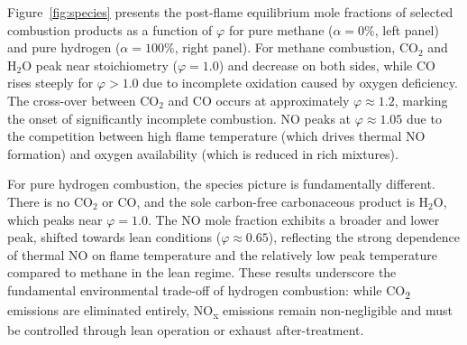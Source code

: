 \documentclass[12pt,a4paper]{article}
\newcommand{\phisym}{\varphi}
\newcommand{\alphasym}{\alpha}
\begin{document}
Figure~\ref{fig:species} presents the post-flame equilibrium mole fractions of selected combustion products as a function of \(\phisym\) for pure methane (\(\alphasym = 0\%\), left panel) and pure hydrogen (\(\alphasym = 100\%\), right panel). For methane combustion, \(\mathrm{CO_2}\) and \(\mathrm{H_2O}\) peak near stoichiometry (\(\phisym = 1.0\)) and decrease on both sides, while CO rises steeply for \(\phisym > 1.0\) due to incomplete oxidation caused by oxygen deficiency. The cross-over between \(\mathrm{CO_2}\) and CO occurs at approximately \(\phisym \approx 1.2\), marking the onset of significantly incomplete combustion. NO peaks at \(\phisym \approx 1.05\) due to the competition between high flame temperature (which drives thermal NO formation) and oxygen availability (which is reduced in rich mixtures).

For pure hydrogen combustion, the species picture is fundamentally different. There is no \(\mathrm{CO_2}\) or CO, and the sole carbon-free carbonaceous product is \(\mathrm{H_2O}\), which peaks near \(\phisym = 1.0\). The NO mole fraction exhibits a broader and lower peak, shifted towards lean conditions (\(\phisym \approx 0.65\)), reflecting the strong dependence of thermal NO on flame temperature and the relatively low peak temperature compared to methane in the lean regime. These results underscore the fundamental environmental trade-off of hydrogen combustion: while CO\textsubscript{2} emissions are eliminated entirely, NO\textsubscript{x} emissions remain non-negligible and must be controlled through lean operation or exhaust after-treatment.
\end{document}
